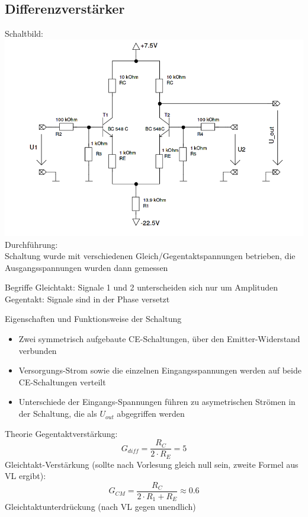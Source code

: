 \documentclass[compress,11pt]{beamer}
\begin{document}
\subsection{Differenzverstärker}
\begin{frame}
Schaltbild:\\

\includegraphics[width=.7\textwidth]{schaltbilder/schalt_3c}\\
Durchführung:\\
Schaltung wurde mit verschiedenen Gleich/Gegentaktspannungen betrieben, die Ausgangsspannungen wurden dann gemessen
\end{frame}
\begin{frame}
\begin{block}{Begriffe}
Gleichtakt: Signale 1 und 2 unterscheiden sich nur um Amplituden
Gegentakt: Signale sind in der Phase versetzt
\end{block}
\end{frame}
\begin{frame}
\begin{block}{Eigenschaften und Funktionsweise der Schaltung}
\begin{itemize}
\item Zwei symmetrisch aufgebaute CE-Schaltungen, über den Emitter-Widerstand verbunden
\item Versorgungs-Strom sowie die einzelnen Eingangsspannungen werden auf beide CE-Schaltungen verteilt
\item Unterschiede der Eingangs-Spannungen führen zu asymetrischen Strömen in der Schaltung, die als $U_{out}$ abgegriffen werden
\end{itemize}
\end{block}
\end{frame}
\begin{frame}
\begin{block}{Theorie}
Gegentaktverstärkung:
\begin{equation}
G_{diff} = \frac{R_C}{2 \cdot R_E} = 5
\end{equation}
Gleichtakt-Verstärkung (sollte nach Vorlesung gleich null sein, zweite Formel aus VL ergibt):
\begin{equation}
G_{CM} = \frac{R_C}{2 \cdot R_1 + R_E} \approx 0.6
\end{equation}
Gleichtaktunterdrückung (nach VL gegen unendlich)
\end{block}
\end{frame}
\end{document}
